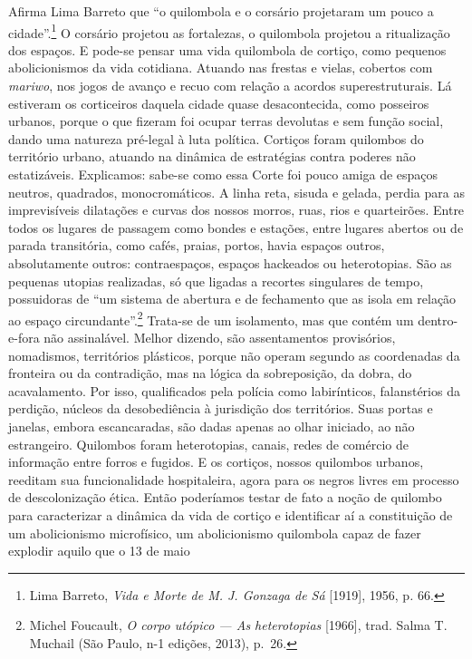 Afirma Lima Barreto que ``o quilombola e o corsário projetaram um pouco
a cidade''.\footnote{Lima Barreto, \textit{Vida e Morte de M. J. Gonzaga
  de Sá} {[}1919{]}, 1956, p\textit{.} 66.} O corsário projetou as
fortalezas, o quilombola projetou a ritualização dos espaços. E pode-se
pensar uma vida quilombola de cortiço, como pequenos abolicionismos da
vida cotidiana. Atuando nas frestas e vielas, cobertos com
\textit{mariwo}, nos jogos de avanço e recuo com relação a acordos
superestruturais. Lá estiveram os corticeiros daquela cidade quase
desacontecida, como posseiros urbanos, porque o que fizeram foi ocupar
terras devolutas e sem função social, dando uma natureza pré-legal à
luta política. Cortiços foram quilombos do território urbano, atuando na
dinâmica de estratégias contra poderes não estatizáveis. Explicamos:
sabe-se como essa Corte foi pouco amiga de espaços neutros, quadrados,
monocromáticos. A linha reta, sisuda e gelada, perdia para as
imprevisíveis dilatações e curvas dos nossos morros, ruas, rios e
quarteirões. Entre todos os lugares de passagem como bondes e estações,
entre lugares abertos ou de parada transitória, como cafés, praias,
portos, havia espaços outros, absolutamente outros: contraespaços,
espaços hackeados ou heterotopias. São as pequenas utopias realizadas,
só que ligadas a recortes singulares de tempo, possuidoras de ``um
sistema de abertura e de fechamento que as isola em relação ao espaço
circundante''.\footnote{Michel Foucault, \textit{O corpo utópico --- As
  heterotopias} {[}1966{]}, trad. Salma T. Muchail (São Paulo, n-1
  edições, 2013), p.~26.} Trata-se de um isolamento, mas que contém um
dentro-e-fora não assinalável. Melhor dizendo, são assentamentos
provisórios, nomadismos, territórios plásticos, porque não operam
segundo as coordenadas da fronteira ou da contradição, mas na lógica da
sobreposição, da dobra, do acavalamento. Por isso, qualificados pela
polícia como labirínticos, falanstérios da perdição, núcleos da
desobediência à jurisdição dos territórios. Suas portas e janelas,
embora escancaradas, são dadas apenas ao olhar iniciado, ao não
estrangeiro. Quilombos foram heterotopias, canais, redes de comércio de
informação entre forros e fugidos. E os cortiços, nossos quilombos
urbanos, reeditam sua funcionalidade hospitaleira, agora para os negros
livres em processo de descolonização ética. Então poderíamos testar de
fato a noção de quilombo para caracterizar a dinâmica da vida de cortiço
e identificar aí a constituição de um abolicionismo microfísico, um
abolicionismo quilombola capaz de fazer explodir aquilo que o 13 de maio
